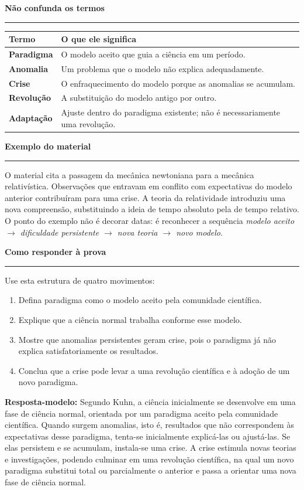 \documentclass[11pt,a4paper]{article}
\newcommand{\secao}[1]{\vspace{0.8em}\noindent\textcolor{azul}{\Large\textbf{#1}}\par\vspace{0.2em}\hrule\vspace{0.35em}}
\begin{document}
\secao{Não confunda os termos}

\begin{tabularx}{\linewidth}{>{\bfseries}p{3.1cm}X}
\hline
\rowcolor{azulclaro}Termo & O que ele significa \\
\hline
Paradigma & O modelo aceito que guia a ciência em um período. \\
Anomalia & Um problema que o modelo não explica adequadamente. \\
Crise & O enfraquecimento do modelo porque as anomalias se acumulam. \\
Revolução & A substituição do modelo antigo por outro. \\
Adaptação & Ajuste dentro do paradigma existente; não é necessariamente uma revolução. \\
\hline
\end{tabularx}

\secao{Exemplo do material}

O material cita a passagem da mecânica newtoniana para a mecânica relativística. Observações que entravam em conflito com expectativas do modelo anterior contribuíram para uma crise. A teoria da relatividade introduziu uma nova compreensão, substituindo a ideia de tempo absoluto pela de tempo relativo. O ponto do exemplo não é decorar datas: é reconhecer a sequência \textit{modelo aceito $\rightarrow$ dificuldade persistente $\rightarrow$ nova teoria $\rightarrow$ novo modelo}.

\secao{Como responder à prova}

Use esta estrutura de quatro movimentos:

\begin{enumerate}[leftmargin=0.7cm,itemsep=0.35em]
\item Defina paradigma como o modelo aceito pela comunidade científica.
\item Explique que a ciência normal trabalha conforme esse modelo.
\item Mostre que anomalias persistentes geram crise, pois o paradigma já não explica satisfatoriamente os resultados.
\item Conclua que a crise pode levar a uma revolução científica e à adoção de um novo paradigma.
\end{enumerate}

\textbf{Resposta-modelo:} Segundo Kuhn, a ciência inicialmente se desenvolve em uma fase de ciência normal, orientada por um paradigma aceito pela comunidade científica. Quando surgem anomalias, isto é, resultados que não correspondem às expectativas desse paradigma, tenta-se inicialmente explicá-las ou ajustá-las. Se elas persistem e se acumulam, instala-se uma crise. A crise estimula novas teorias e investigações, podendo culminar em uma revolução científica, na qual um novo paradigma substitui total ou parcialmente o anterior e passa a orientar uma nova fase de ciência normal.
\end{document}
